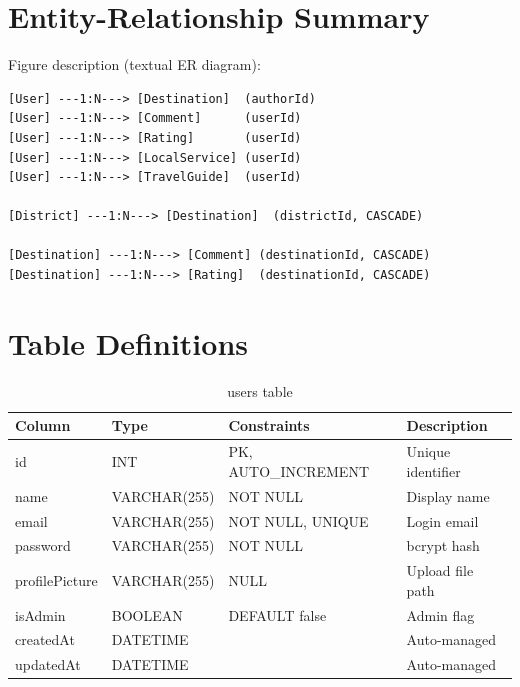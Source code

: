 \documentclass[12pt,a4paper]{report}
\begin{document}
\section{Entity-Relationship Summary}

Figure description (textual ER diagram):

\begin{lstlisting}[caption={Textual ER diagram}]
[User] ---1:N---> [Destination]  (authorId)
[User] ---1:N---> [Comment]      (userId)
[User] ---1:N---> [Rating]       (userId)
[User] ---1:N---> [LocalService] (userId)
[User] ---1:N---> [TravelGuide]  (userId)

[District] ---1:N---> [Destination]  (districtId, CASCADE)

[Destination] ---1:N---> [Comment] (destinationId, CASCADE)
[Destination] ---1:N---> [Rating]  (destinationId, CASCADE)
\end{lstlisting}

\section{Table Definitions}

\begin{table}[H]
  \centering
  \caption{users table}
  \begin{tabular}{llll}
    \toprule
    Column & Type & Constraints & Description \\
    \midrule
    id             & INT  & PK, AUTO\_INCREMENT & Unique identifier \\
    name           & VARCHAR(255) & NOT NULL & Display name \\
    email          & VARCHAR(255) & NOT NULL, UNIQUE & Login email \\
    password       & VARCHAR(255) & NOT NULL & bcrypt hash \\
    profilePicture & VARCHAR(255) & NULL & Upload file path \\
    isAdmin        & BOOLEAN & DEFAULT false & Admin flag \\
    createdAt      & DATETIME & & Auto-managed \\
    updatedAt      & DATETIME & & Auto-managed \\
    \bottomrule
  \end{tabular}
\end{table}
\end{document}

